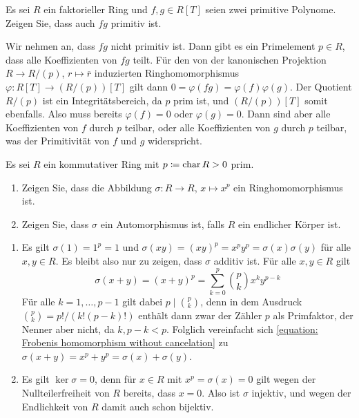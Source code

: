 \begin{question}[subtitle = Ein Lemma von Gauß]
  Es sei $R$ ein faktorieller Ring und $f, g \in R[T]$ seien zwei primitive Polynome.
  Zeigen Sie, dass auch $fg$ primitiv ist.
\end{question}


\begin{question}
  Wir nehmen an, dass $fg$ nicht primitiv ist.
  Dann gibt es ein Primelement $p \in R$, dass alle Koeffizienten von $fg$ teilt.
  Für den von der kanonischen Projektion $R \to R/(p)$, $r \mapsto \overline{r}$ induzierten Ringhomomorphismus $\varphi \colon R[T] \to (R/(p))[T]$ gilt dann $0 = \varphi(fg) = \varphi(f) \varphi(g)$.
  Der Quotient $R/(p)$ ist ein Integritätsbereich, da $p$ prim ist, und $(R/(p))[T]$ somit ebenfalls.
  Also muss bereits $\varphi(f) = 0$ oder $\varphi(g) = 0$.
  Dann sind aber alle Koeffizienten von $f$ durch $p$ teilbar, oder alle Koeffizienten von $g$ durch $p$ teilbar, was der Primitivität von $f$ und $g$ widerspricht.
\end{question}


\begin{question}[subtitle = Der Frobeniushomomorphismus]
  \label{question: the frobenius homomorphism}
  Es sei $R$ ein kommutativer Ring mit $p \coloneqq \operatorname{char} R > 0$ prim.
  \begin{enumerate}
    \item
      Zeigen Sie, dass die Abbildung $\sigma \colon R \to R$, $x \mapsto x^p$ ein Ringhomomorphismus ist.
    \item
      Zeigen Sie, dass $\sigma$ ein Automorphismus ist, falls $R$ ein endlicher Körper ist.
  \end{enumerate}
\end{question}


\begin{solution}
  \begin{enumerate}
    \item
      Es gilt $\sigma(1) = 1^p = 1$ und $\sigma(xy) = (xy)^p = x^p y^p = \sigma(x) \sigma(y)$ für alle $x, y \in R$.
      Es bleibt also nur zu zeigen, dass $\sigma$ additiv ist.
      Für alle $x, y \in R$ gilt
      \begin{equation}
        \label{equation: Frobenis homomorphism without cancelation}
        \sigma(x+y) = (x+y)^p = \sum_{k=0}^p \binom{p}{k} x^k y^{p-k}
      \end{equation}
      Für alle $k = 1, \dotsc, p-1$ gilt dabei $p \mid \binom{p}{k}$, denn in dem Ausdruck $\binom{p}{k} = p!/(k!(p-k)!)$ enthält dann zwar der Zähler $p$ als Primfaktor, der Nenner aber nicht, da $k, p-k < p$.
      Folglich vereinfacht sich \eqref{equation: Frobenis homomorphism without cancelation} zu $\sigma(x+y) = x^p + y^p = \sigma(x) + \sigma(y)$.
    \item
      Es gilt $\ker \sigma = 0$, denn für $x \in R$ mit $x^p = \sigma(x) = 0$ gilt wegen der Nullteilerfreiheit von $R$ bereits, dass $x = 0$.
      Also ist $\sigma$ injektiv, und wegen der Endlichkeit von $R$ damit auch schon bijektiv.
  \end{enumerate}
\end{solution}


